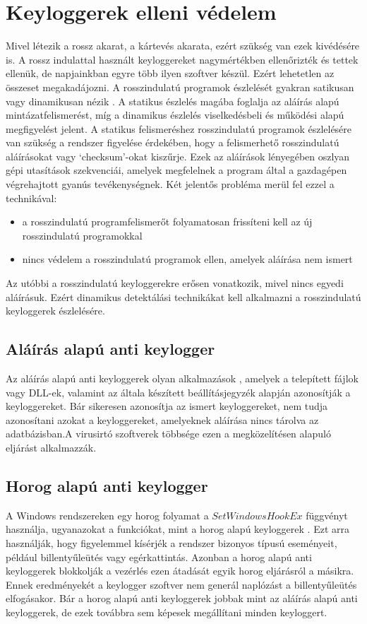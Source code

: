 \documentclass[12pt,a4paper,oneside]{report}
\begin{document}
\section{Keyloggerek elleni védelem}
Mivel létezik a rossz akarat, a kártevés akarata, ezért szükség van ezek kivédésére is. A rossz indulattal használt keyloggereket nagymértékben ellenőrizték és tettek ellenük, de napjainkban egyre több ilyen szoftver készül. Ezért lehetetlen az összeset megakadájozni. A rosszindulatú programok észlelését gyakran satikusan vagy dinamikusan nézik  \cite{wood2010keyloggers}. A statikus észlelés magába foglalja az aláírás alapú mintázatfelismerést, míg a dinamikus észlelés viselkedésbeli és működési alapú megfigyelést jelent. A statikus felismeréshez rosszindulatú programok észlelésére van szükség a rendszer figyelése érdekében, hogy a felismerhető rosszindulatú aláírásokat vagy `checksum'-okat kiszűrje. Ezek az aláírások lényegében oszlyan gépi utasítások szekvenciái, amelyek megfelelnek a program által a gazdagépen végrehajtott gyanús tevékenységnek. Két jelentős probléma merül fel ezzel a technikával:
\begin{itemize}
\item a rosszindulatú programfelismerőt folyamatosan frissíteni kell az új rosszindulatú programokkal
\item nincs védelem a rosszindulatú programok ellen, amelyek aláírása nem ismert
\end{itemize}
Az utóbbi a rosszindulatú keyloggerekre erősen vonatkozik, mivel nincs egyedi aláírásuk. Ezért dinamikus detektálási technikákat kell alkalmazni a rosszindulatú keyloggerek észlelésére.

\subsection{Aláírás alapú anti keylogger}
Az aláírás alapú anti keyloggerek olyan alkalmazások \cite{tuli2013system}, amelyek a telepített fájlok vagy DLL-ek, valamint az általa készített beállításjegyzék alapján azonosítják a keyloggereket. Bár sikeresen azonosítja az ismert keyloggereket, nem tudja azonosítani azokat a keyloggereket, amelyeknek aláírása nincs tárolva az adatbázisban.A virusirtó szoftverek többsége ezen a megközelítésen alapuló eljárást alkalmazzák.

\subsection{Horog alapú anti keylogger}
A Windows rendszereken egy horog folyamat a $SetWindowsHookEx$ függvényt használja, ugyanazokat a funkciókat, mint a horog alapú keyloggerek \cite{tuli2013system}. Ezt arra használják, hogy figyelemmel kísérjék a rendszer bizonyos típusú eseményeit, például billentyűleütés vagy egérkattintás. Azonban a horog alapú anti keyloggerek blokkolják a vezérlés ezen átadását egyik horog eljárásról a másikra. Ennek eredményekét a keylogger szoftver nem generál naplózást a billentyűleütés elfogásakor. Bár a horog alapú anti keyloggerek jobbak mint az aláírás alapú anti keyloggerek, de ezek továbbra sem képesek megállítani minden keyloggert.
\end{document}
